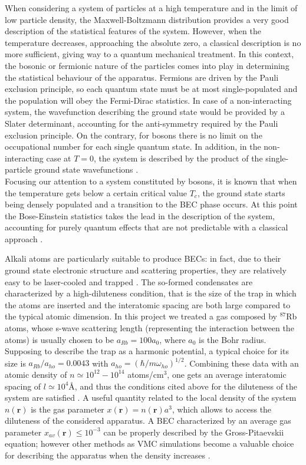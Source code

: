 When considering a system of particles at a high temperature and in the limit of low particle density, the Maxwell-Boltzmann distribution provides a very good description of the statistical features of the system. However, when the temperature decreases, approaching the absolute zero, a classical description is no more sufficient, giving way to a quantum mechanical treatment. In this context, the bosonic or fermionic nature of the particles comes into play in determining the statistical behaviour of the apparatus. Fermions are driven by the Pauli exclusion principle, so each quantum state must be at most single-populated and the population will obey the Fermi-Dirac statistics. In case of a non-interacting system, the wavefunction describing the ground state would be provided by a Slater determinant, accounting for the anti-symmetry required by the Pauli exclusion principle. On the contrary, for bosons there is no limit on the occupational number for each single quantum state. In addition, in the non-interacting case at $T=0$, the system is described by the product of the single-particle ground state wavefunctions \cite{dalfovo1999}.\\

Focusing our attention to a system constituted by bosons, it is known that when the temperature gets below a certain critical value $T_c$, the ground state starts being densely populated and a transition to the BEC phase occurs. At this point the Bose-Einstein statistics takes the lead in the description of the system, accounting for purely quantum effects that are not predictable with a classical approach \cite{dalfovo1999}.

Alkali atoms are particularly suitable to produce BECs: in fact, due to their ground state electronic structure and scattering properties, they are relatively easy to be laser-cooled and trapped \cite{dalfovo1999}. The so-formed condensates are characterized by a high-diluteness condition, that is the size of the trap in which the atoms are inserted and the interatomic spacing are both large compared to the typical atomic dimension. In this project we treated a gas composed by $^{87}$Rb atoms, whose s-wave scattering length (representing the interaction between the atoms) is usually chosen to be $a_{Rb} = 100a_0$, where $a_0$ is the Bohr radius. Supposing to describe the trap as a harmonic potential, a typical choice for its size is $a_{Rb}/a_{ho} = 0.0043$ with $a_{ho}= \left( \hbar /m \omega_{ho}\right)^{1/2}$. Combining these data with an atomic density of $n \simeq 10^{12} - 10^{14}$ atoms/cm$^3$, one gets an average interatomic spacing of $l\simeq 10^4$\AA, and thus the conditions cited above for the diluteness of the system are satisfied \cite{duBois}. A useful quantity related to the local density of the system $n(\bm{r})$ is the gas parameter $x(\bm{r}) = n(\bm{r}) a^3$, which allows to access the diluteness of the considered apparatus. A BEC characterized by an average gas parameter $x_{av}(\bm{r}) \leq 10^{-3}$ can be properly described by the Gross-Pitaevskii equation; however other methods as VMC simulations become a valuable choice for describing the apparatus when the density increases \cite{Nilsen2005}.  



